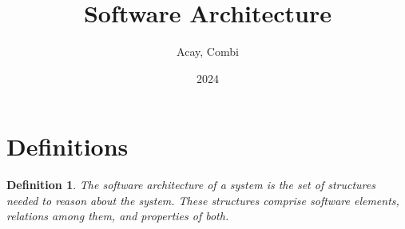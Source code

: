 \documentclass[12pt, oneside]{article}
\title{Software Architecture}
\author{Acay, Combi}
\date{2024}
\newtheorem{defn}{Definition}
\begin{document}
\maketitle
\tableofcontents

\vspace{.25in}

\section{Definitions}

\begin{defn}
The software architecture of a system is the set of structures needed to
reason about the system. These structures comprise software elements,
relations among them, and properties of both.
\end{defn}
\end{document}
